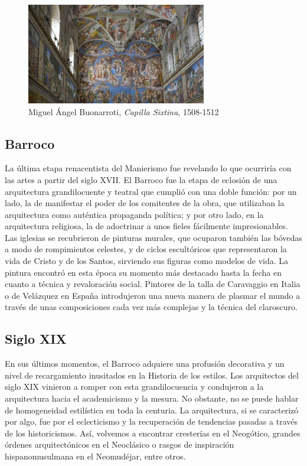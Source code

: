 \begin{figure}[!h]
    \begin{center}
        \includegraphics[width=0.7\textwidth]{imagenes/2/capilla-sixtina.jpg}
        \caption{Miguel Ángel Buonarroti, \textit{Capilla Sixtina}, 1508-1512}
        \label{fig:capilla-sixtina}
    \end{center}
\end{figure}

\subsection{Barroco}

La última etapa renacentista del Manierismo fue revelando lo que ocurriría con las artes a partir del siglo XVII. El Barroco fue la etapa de eclosión de una arquitectura grandilocuente y teatral que cumplió con una doble función: por un lado, la de manifestar el poder de los comitentes de la obra, que utilizaban la arquitectura como auténtica propaganda política; y por otro lado, en la arquitectura religiosa, la de adoctrinar a unos fieles fácilmente impresionables. Las iglesias se recubrieron de pinturas murales, que ocuparon también las bóvedas a modo de rompimientos celestes, y de ciclos escultóricos que representaron la vida de Cristo y de los Santos, sirviendo sus figuras como modelos de vida. La pintura encontró en esta época su momento más destacado hasta la fecha en cuanto a técnica y revaloración social. Pintores de la talla de Caravaggio en Italia o de Velázquez en España introdujeron una nueva manera de plasmar el mundo a través de unas composiciones cada vez más complejas y la técnica del claroscuro.

\subsection{Siglo XIX}

En sus últimos momentos, el Barroco adquiere una profusión decorativa y un nivel de recargamiento inusitados en la Historia de los estilos. Los arquitectos del siglo XIX vinieron a romper con esta grandilocuencia y condujeron a la arquitectura hacia el academicismo y la mesura. No obstante, no se puede hablar de homogeneidad estilística en toda la centuria. La arquitectura, si se caracterizó por algo, fue por el eclecticismo y la recuperación de tendencias pasadas a través de los historicismos. Así, volvemos a encontrar cresterías en el Neogótico, grandes órdenes arquitectónicos en el Neoclásico o rasgos de inspiración hispanomusulmana en el Neomudéjar, entre otros.

